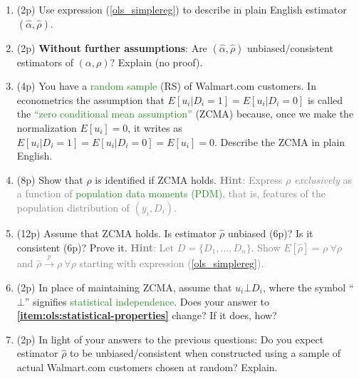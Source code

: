 \documentclass{article}
\begin{document}
\begin{enumerate}[label=\textbf{Q\arabic{enumi}}.,ref=Q\arabic{enumi}, wide=0pt, itemsep=1em, topsep=5pt]
\begin{enumerate}
        \item (2p) Use expression (\ref{ols_simplereg}) to describe in plain English estimator $\left( \widehat{\alpha }, \widehat{\rho }\right) $.\label{item:q1-old-as-group-averages}
                
        \item (2p) \textbf{Without further assumptions}: Are $\left( \widehat{\alpha }, \widehat{\rho }\right) $ unbiased/consistent estimators of $\left( \alpha,\rho \right) $? Explain (no proof).
        
        \item (4p) You have a \textcolor{ForestGreen}{random sample} (RS) of Walmart.com customers. In econometrics the assumption that $E\left[ u _{i}|D_{i}=1\right] =E\left[ u _{i}|D_{i}=0\right] $ is called the \textcolor{ForestGreen}{``zero conditional mean assumption''} (ZCMA) because, once we make the normalization $E[u_i]=0$, it writes as $E\left[ u _{i}|D_{i}=1\right] =E\left[ u _{i}|D_{i}=0\right] = E[u_i]=0$. Describe the ZCMA in plain English. 
        
        \item (8p) Show that $\rho$ is identified if ZCMA holds. \textcolor{gray}{\textbf{Hint}: Express $\rho$ \textit{exclusively} as a function of \textcolor{ForestGreen}{population data moments (PDM)}, that is, features of the population distribution of $(y_i,D_i)$.}
        
        \item (12p) Assume that ZCMA holds. Is estimator $\widehat{\rho }$ unbiased (6p)? Is it consistent (6p)? Prove it. \textcolor{gray}{\textbf{Hint}: Let $D=\{D_1,\dots,D_n\}$. Show $E[\widehat{\rho}]=\rho \ \forall \rho$ and $\widehat{\rho} \overset{p}{\rightarrow }\rho \ \forall \rho$ starting with expression (\ref{ols_simplereg}).}\label{item:ols:statistical-properties}
        
        \item (2p) In place of maintaining ZCMA, assume that $u _{i}\bot D_{i}$, where the symbol ``$\bot $'' signifies \textcolor{ForestGreen}{statistical independence}. Does your answer to \textbf{\ref{item:ols:statistical-properties}} change? If it does, how?
        
        \item (2p) In light of your answers to the previous questions: Do you expect estimator $\widehat{\rho }$ to be unbiased/consistent when constructed using a sample of actual Walmart.com customers chosen at random? Explain.
        \end{enumerate}
        

\end{enumerate}
\end{document}
